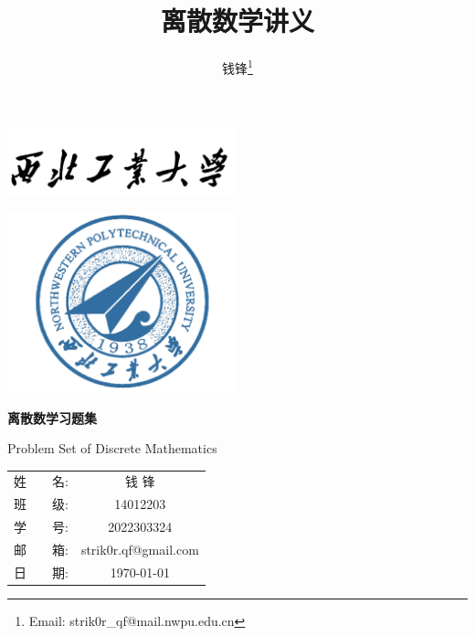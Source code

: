 \documentclass[10pt,UTF8]{book} %
\title{\textbf{离散数学}讲义}
\author{钱锋\thanks{Email: strik0r\_qf@mail.nwpu.edu.cn}}
\begin{document}


\begin{titlepage}
    \thispagestyle{empty}
    \centering
        \vspace*{2cm}
        \includegraphics[width=0.5\textwidth]{pic/npu_2.png}\par
        \vspace{1em}
        \includegraphics[width=0.5\textwidth]{pic/npu_1.png}\par
    \vspace{2em}
        \begin{center}
            \Huge \heiti \textbf{离散数学习题集}

            Problem Set of Discrete Mathematics
        \end{center}
        \vspace{3cm}
        \begin{center}
        \songti
        \renewcommand\arraystretch{1.5}
	\begin{tabular}{p{2cm} c c}
    {姓\,\,\,\,\,\,\,\,\,\,\,\,名:} & \multicolumn{2}{c}{钱 \quad\quad 锋}\\
    \cline{2-3}
    {班\,\,\,\,\,\,\,\,\,\,\,\,级:} & \multicolumn{2}{c}{14012203} \\
    \cline{2-3}
    {学\,\,\,\,\,\,\,\,\,\,\,\,号:} & \multicolumn{2}{c}{2022303324}\\
    \cline{2-3}
    {邮\,\,\,\,\,\,\,\,\,\,\,\,箱:} & \multicolumn{2}{c}{strik0r.qf@gmail.com}\\
    \cline{2-3}
    {日\,\,\,\,\,\,\,\,\,\,\,\,期:} & \multicolumn{2}{c}{\today}\\
    \cline{2-3}
	\end{tabular}
    \end{center}
\end{titlepage}
\end{document}
